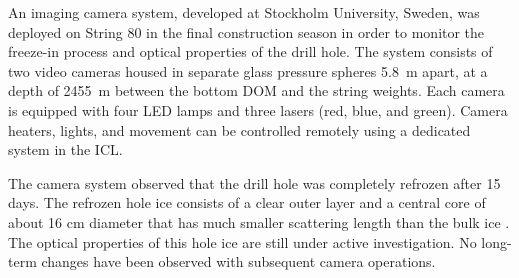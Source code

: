 An imaging camera system, developed at Stockholm University, Sweden, was deployed on String 80 in the final
construction season in order to monitor the freeze-in process and optical
properties of the drill hole.  The system consists of two video cameras
housed in separate glass pressure spheres \SI{5.8}{m} apart, at a
depth of \SI{2455}{m} between the bottom DOM and the string weights.  Each
camera is equipped with four LED lamps and three lasers (red, blue, and
green).  Camera heaters, lights, and movement can be controlled remotely
using a dedicated system in the ICL.  

The camera system observed that the drill hole was completely refrozen after
15 days.  The refrozen hole ice consists of a clear outer
layer and a central core of about 16 cm diameter that has much
smaller scattering length than the bulk ice \cite{rongen_vlvnt15}.  The
optical properties of this hole ice are still under active investigation.
No long-term changes have been observed with subsequent camera operations.
